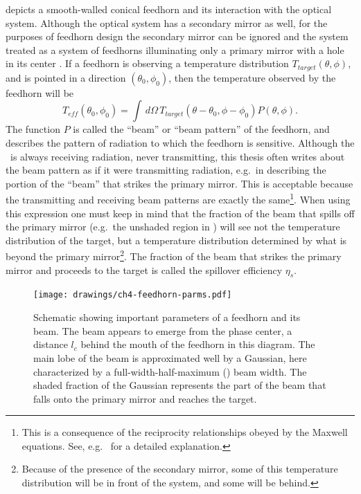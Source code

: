  depicts a smooth-walled conical feedhorn and its interaction with the optical system.
Although the optical system has a secondary mirror as well, for the purposes of feedhorn design the secondary mirror can be ignored and the system treated as a system of feedhorns illuminating only a primary mirror with a hole in its center \cite{goldsmith_quasioptical_1998}.
If a feedhorn is observing a temperature distribution $T_{target}(\theta,\phi)$, and is pointed in a direction $(\theta_0, \phi_0)$, then the temperature observed by the feedhorn will be
\begin{equation}
    T_{eff}(\theta_0,\phi_0) = \int \, d \Omega \, T_{target}(\theta - \theta_0,\phi - \phi_0) P(\theta,\phi).
\end{equation}
The function $P$ is called the ``beam'' or ``beam pattern'' of the feedhorn, and describes the pattern of radiation to which the feedhorn is sensitive.
Although the \Imager\ is always receiving radiation, never transmitting, this thesis often writes about the beam pattern as if it were transmitting radiation, e.g.\ in describing the portion of the ``beam'' that strikes the primary mirror.
This is acceptable because the transmitting and receiving beam patterns are exactly the same\footnote{This is a consequence of the reciprocity relationships obeyed by the Maxwell equations. See, e.g.\ \cite{balanis_antenna_2005} for a detailed explanation.}.
When using this expression one must keep in mind that the fraction of the beam that spills off the primary mirror (e.g.\ the unshaded region in ) will see not the temperature distribution of the target, but a temperature distribution determined by what is beyond the primary mirror\footnote{Because of the presence of the secondary mirror, some of this temperature distribution will be in front of the system, and some will be behind.}.
The fraction of the beam that strikes the primary mirror and proceeds to the target is called the spillover efficiency $\eta_s$.

\begin{figure}
\centering
\texttt{[image: drawings/ch4-feedhorn-parms.pdf]}
\caption{Schematic showing important parameters of a feedhorn and its beam. The beam appears to emerge from the phase center, a distance $l_c$ behind the mouth of the feedhorn in this diagram. The main lobe of the beam is approximated well by a Gaussian, here characterized by a full-width-half-maximum (\FWHM) beam width. The shaded fraction of the Gaussian represents the part of the beam that falls onto the primary mirror and reaches the target.}
\label{fig:feedhorn-parms}
\end{figure}

